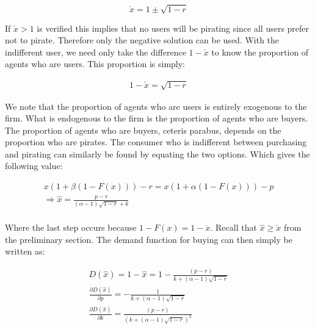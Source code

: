 \documentclass[12pt]{report}
\numberwithin{equation}{section}
\begin{document}
\begin{equation*}
\check{x} = 1
\pm \sqrt{ 1 -r }
\end{equation*}

If $\check{x}>1$ is verified this implies that no users will be pirating since all users prefer not to pirate. Therefore only the negative solution can be used.  With the indifferent user, we need only take the difference $1-\check{x}$ to know the proportion of agents who are users. This proportion is simply:

\begin{align*}
1-\check{x}=\sqrt{ 1 -r }
\end{align*}

We note that the proportion of agents who are users is entirely exogenous to the firm. What is endogenous to the firm is the proportion of agents who are buyers. The proportion of agents who are buyers, ceteris parabus, depends on the proportion who are pirates. The consumer who is indifferent between purchasing and pirating can similarly be found by equating the two options. Which gives the following value:

\begin{align*}
x(1+\beta(1-F(x)))-r=x(1+\alpha(1-F(x)))-p \\
\Rightarrow \hat{x}=\frac{p-r}{(\alpha-1)\sqrt{ 1 -r }+k} \\
\end{align*}

Where the last step occurs because $1-F(x)=1-\check{x}$. Recall that $\hat{x} \geq \check{x}$ from the preliminary section. The demand function for buying can then simply be written as:

\begin{align*}
D(\hat{x})=1-\hat{x}=1-\frac{ (p-r)}{k + (\alpha-1) \sqrt{ 1 -r }} \\
\frac{\partial D(\hat{x})}{\partial p} =
-\frac{ 1}{k + (\alpha-1) \sqrt{ 1 -r }} \\
\frac{\partial D(\hat{x})}{\partial k} =
\frac{ (p-r) }{(k+
 (\alpha-1)\sqrt{ 1 - r }
)^2} 
\end{align*}

\end{document}
